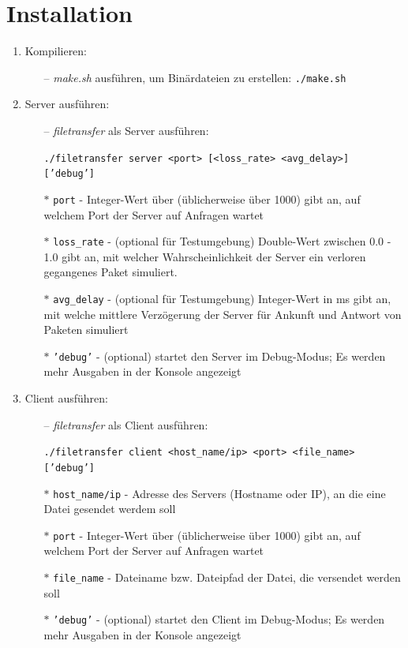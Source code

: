 \documentclass{article}
\begin{document}
	\section{Installation}
	\begin{enumerate}
		\item Kompilieren:

		\begin{enumerate}
			\item[--] \textit{make.sh} ausführen, um Binärdateien zu erstellen: \texttt{./make.sh}
		\end{enumerate}

		\item Server ausführen:

		\begin{enumerate}
			\item[--] \textit{filetransfer} als Server ausführen:

			\texttt{./filetransfer server <port> [<loss\_rate> <avg\_delay>] ['debug']}

			\item[$\ast$] \texttt{port} - Integer-Wert über (üblicherweise über 1000) gibt an, auf welchem Port der Server auf Anfragen wartet
			\item[$\ast$] \texttt{loss\_rate} - (optional für Testumgebung) Double-Wert zwischen 0.0 - 1.0 gibt an, mit welcher Wahrscheinlichkeit der Server ein verloren gegangenes Paket simuliert.
			\item[$\ast$] \texttt{avg\_delay} - (optional für Testumgebung) Integer-Wert in ms gibt an, mit welche mittlere Verzögerung der Server für Ankunft und Antwort von Paketen simuliert
			\item[$\ast$] \texttt{'debug'} - (optional) startet den Server im Debug-Modus; Es werden mehr Ausgaben in der Konsole angezeigt

		\end{enumerate}

		\item Client ausführen:

		\begin{enumerate}
			\item[--] \textit{filetransfer} als Client ausführen:

			\texttt{./filetransfer client <host\_name/ip> <port> <file\_name> ['debug']}

			\item[$\ast$] \texttt{host\_name/ip} - Adresse des Servers (Hostname oder IP), an die eine Datei gesendet werdem soll
			\item[$\ast$] \texttt{port} - Integer-Wert über (üblicherweise über 1000) gibt an, auf welchem Port der Server auf Anfragen wartet
			\item[$\ast$] \texttt{file\_name} - Dateiname bzw. Dateipfad der Datei, die versendet werden soll
			\item[$\ast$] \texttt{'debug'} - (optional) startet den Client im Debug-Modus; Es werden mehr Ausgaben in der Konsole angezeigt

		\end{enumerate}
	\end{enumerate}
\end{document}
